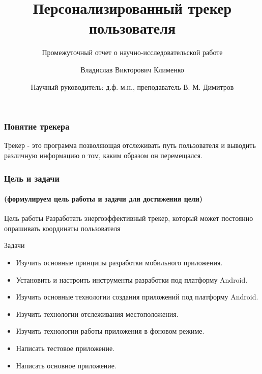 \documentclass[hyperref={unicode}]{beamer}
\title[%
    Бобры и Интернет
]{%
	Персонализированный трекер\\
	пользователя
}
\subtitle{Промежуточный отчет о научно-исследовательской работе}
\author[%
    Владислав Клименко
]{%
    Владислав Викторович Клименко
}
\date[%
    01.06.2018
]{%
    Научный руководитель: д.ф.-м.н., преподаватель  В. М. Димитров
}
\institute[%
    ПетрГУ
]{%
    Петрозаводский государственный университет\\
    Кафедра информатики и математического обеспечения
}
\begin{document}
\begin{frame}
\maketitle
\end{frame}

\begin{frame}
  \frametitle{Понятие трекера}
  Трекер - это программа позволяющая отслеживать путь пользователя и выводить
  различную информацию о том, каким образом он перемещался.
\end{frame}

\begin{frame}
  \frametitle{Цель и задачи}
  \framesubtitle{(формулируем цель работы и задачи для достижения цели)}
  \begin{block}{Цель работы}
    Разработать энергоэффективный трекер, который может
    постоянно опрашивать координаты пользователя
  \end{block}
  \begin{block}{Задачи}
  \begin{itemize}
  	\item Изучить основные принципы разработки мобильного приложения.
  	\item Установить и настроить инструменты разработки под платформу Android.
  	\item Изучить основные технологии создания приложений под платформу Android.
  	\item Изучить технологии отслеживания местоположения.
  	\item Изучить технологии работы приложения в фоновом режиме.
  	\item Написать тестовое приложение.
  	\item Написать основное приложение.
  \end{itemize}
  \end{block}
\end{frame}
\end{document}
